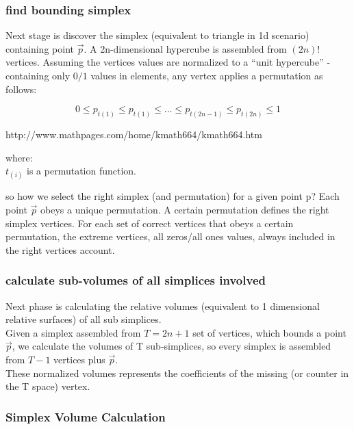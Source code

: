 		\subsubsection{find bounding simplex}
		
		Next stage is discover the simplex (equivalent to triangle in 1d scenario) containing point $\overrightarrow{p}$.
		A 2n-dimensional hypercube is assembled from $(2n)!$ vertices. 
		Assuming the vertices values are normalized to a “unit hypercube” - containing only $0/1$ values in elements, any vertex applies a permutation as follows:
		
		\begin{equation}
		0 \leq p_{t(1)} \leq p_{t(1)} \leq \dots \leq p_{t(2n-1)} \leq p_{t(2n)} \leq 1
		\end{equation}
		
		http://www.mathpages.com/home/kmath664/kmath664.htm
		
		
		where:\\
		$t_{(i)}$ is a permutation function.
		
		so how we select the right simplex (and permutation) for a given point p?
		Each point $\overrightarrow{p}$ obeys a unique permutation. 
		A certain permutation defines the right simplex vertices. 
		For each set of correct vertices that obeys a certain permutation, the extreme vertices, all zeros/all ones values, always included in the right vertices account. 
		
		
		
		\subsubsection{calculate sub-volumes of all simplices involved}
		
		Next phase is calculating the relative volumes (equivalent to 1 dimensional relative surfaces) of all sub simplices. 
		\\Given a simplex assembled from $T = 2n+1$ set of vertices, which bounds a point $\overrightarrow{p}$, we calculate the volumes of T sub-simplices, so every simplex is assembled from $T-1$ vertices plus $\overrightarrow{p}$. 
		\\These normalized volumes represents the coefficients of the missing (or counter in the T space) vertex.
		
		
		
		\subsubsection{Simplex Volume Calculation}
		
